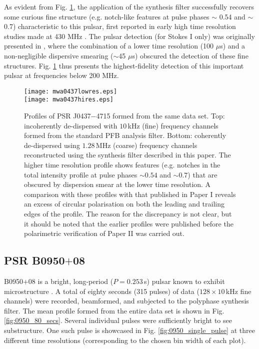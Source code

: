 \documentclass{pasa}%
\newcommand{\psrslowB}{B0950$+$08}
\newcommand{\psrbhatJ}{J0437$-$4715}
\begin{document}
As evident from Fig. \ref{fig:0437}, the application of the synthesis filter successfully recovers some curious fine structure (e.g. notch-like features at pulse phases $\sim$ 0.54 and $\sim$ 0.7) characteristic to this pulsar, first reported in early high time resolution studies made at 430 MHz \citep{Navarro1997}. The pulsar detection (for Stokes I only) was originally presented in \citet{Bhat2018}, where the combination of a lower time resolution (100 $\mu$s) and a non-negligible dispersive smearing ($\sim$45 $\mu$s) obscured the detection of these fine structures. Fig. \ref{fig:0437} thus presents the highest-fidelity detection of this important pulsar at frequencies below 200 MHz.

\begin{figure}[t!]
    \centering
    \texttt{[image: mwa0437lowres.eps]} \\[10pt]
    \texttt{[image: mwa0437hires.eps]}
    \caption{Profiles of PSR \psrbhatJ{} formed from the same data set. Top: incoherently de-dispersed with $10\,$kHz (fine) frequency channels formed from the standard PFB analysis filter. Bottom: coherently de-dispersed using $1.28\,$MHz (coarse) frequency channels reconstructed using the synthesis filter described in this paper. The higher time resolution profile shows features (e.g. notches in the total intensity profile at pulse phases $\sim 0.54$ and $\sim 0.7$) that are obscured by dispersion smear at the lower time resolution. A comparison with these profiles with that published in Paper I reveals an excess of circular polarisation on both the leading and trailing edges of the profile. The reason for the discrepancy is not clear, but it should be noted that the earlier profiles were published before the polarimetric verification of Paper II was carried out.}
    \label{fig:0437}
\end{figure}


\subsection{PSR \psrslowB{}}

\psrslowB{} is a bright, long-period ($P = 0.253\,$s) pulsar known to exhibit microstructure \citep{Popov2002,Kuzmin2003}.
A total of eighty seconds (315 pulses) of data ($128 \times 10\,$kHz fine channels) were recorded, beamformed, and subjected to the polyphase synthesis filter.
The mean profile formed from the entire data set is shown in Fig. \ref{fig:0950_80_secs}.
Several individual pulses were sufficiently bright to see substructure.
One such pulse is showcased in Fig. \ref{fig:0950_single_pulse} at three different time resolutions (corresponding to the chosen bin width of each plot).
\end{document}
